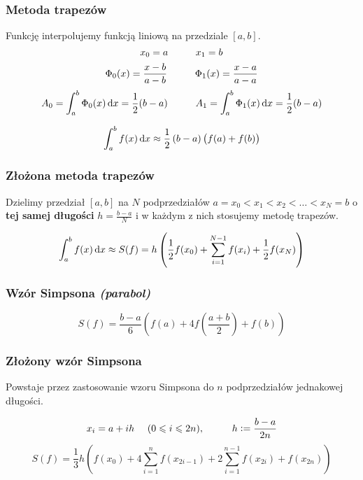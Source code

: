 \documentclass[../mn-notatki.tex]{subfiles}
\begin{document}
\subsubsection{Metoda trapezów}
Funkcję interpolujemy funkcją liniową na przedziale $[a,b]$.
\[
x_0 = a \hspace*{1cm} x_1 = b
\]
\[
\Phi_0(x) = \frac{x-b}{a-b}
\hspace*{1cm}
\Phi_1(x) = \frac{x-a}{a-a}
\]
\[
A_0 = \int_a^b \Phi_0(x) \dif x = \frac{1}{2}(b - a)
\tab
A_1 = \int_a^b \Phi_1(x) \dif x = \frac{1}{2}(b - a)
\]

\begin{tcolorbox}
\[
\int_a^b f(x) \dif x \approx \frac{1}{2}\left(
b - a
\right) \left(
f(a) + f(b)
\right)
\]
\end{tcolorbox}

\subsubsection{Złożona metoda trapezów}

Dzielimy przedział $[a,b]$ na $N$ podprzedziałów
$a = x_0 < x_1 < x_2 < \ldots < x_N = b$ o \textbf{tej samej długości}
$h = \frac{b-a}{N}$ i w każdym z nich stosujemy metodę trapezów.

\begin{tcolorbox}
\[
\int_a^b f(x) \dif x
\approx S(f)
= h \left(
\frac{1}{2}f(x_0)
+ \sum_{i=1}^{N-1} f(x_i)
+ \frac{1}{2} f(x_N)
\right)
\]
\end{tcolorbox}

\subsubsection{Wzór Simpsona \textit{(parabol)}}

\begin{tcolorbox}
\[
S(f) = \frac{b-a}{6} \left(
f(a) + 4f \left(
\frac{a+b}{2}
\right)
+ f(b)
\right)
\]
\end{tcolorbox}

\subsubsection{Złożony wzór Simpsona}
Powstaje przez zastosowanie wzoru Simpsona  do $n$ podprzedziałów jednakowej
długości.
\begin{tcolorbox}
\[
x_i = a + ih ~~~~(0 \leqslant i \leqslant 2n)
, \hspace*{1cm}
h := \frac{b-a}{2n}
\]
\[
S(f) =
\frac{1}{3} h \left(
f(x_0)
+ 4 \sum_{i=1}^n f(x_{2i-1})
+ 2 \sum_{i=1}^{n-1} f(x_{2i})
+ f(x_{2n})
\right)
\]
\end{tcolorbox}
\end{document}
